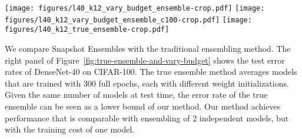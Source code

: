  \begin{figure*}[t]
        \centerline{
        \texttt{[image: figures/l40\_k12\_vary\_budget\_ensemble-crop.pdf]}
        \texttt{[image: figures/l40\_k12\_vary\_budget\_ensemble\_c100-crop.pdf]}
        \texttt{[image: figures/l40\_k12\_true\_ensemble-crop.pdf]}
        }
        \caption[]
        {\small Snapshot Ensembles under different training budgets on {\bf (Left)} CIFAR-10 and {\bf (Middle)} CIFAR-100.
        {\bf Right:} Comparison of Snapshot Ensembles with true ensembles.
        }
        \label{fig:true-ensemble-and-vary-budget}
        \vspace{-1em}
    \end{figure*}


 We compare Snapshot Ensembles with the traditional ensembling method. The right panel of Figure~\ref{fig:true-ensemble-and-vary-budget} shows the test error rates of DenseNet-40 on CIFAR-100. The true ensemble method averages models that are trained with 300 full epochs, each with different weight initializations. Given the same number of models at test time, the error rate of the true ensemble can be seen as a lower bound of our method. Our method achieves performance that is comparable with ensembling of 2 independent models, but with the training cost of one model.











